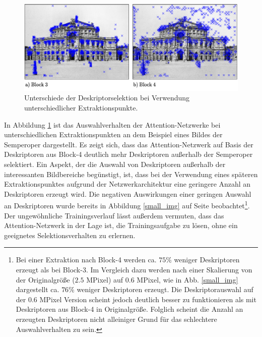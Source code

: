 \begin{figure}[h]
\centering
\includegraphics[scale=0.79]{attention_layer_diff}
\caption{Unterschiede der Deskriptorselektion bei Verwendung unterschiedlicher Extraktionspunkte.}
\label{attention_layer_diff}
\end{figure}
In Abbildung \ref{attention_layer_diff} ist das Auswahlverhalten der Attention-Netzwerke bei unterschiedlichen Extraktionspunkten an dem Beispiel eines Bildes der Semperoper dargestellt. Es zeigt sich, dass das Attention-Netzwerk auf Basis der Deskriptoren aus Block-4 deutlich mehr Deskriptoren außerhalb der Semperoper selektiert.
Ein Aspekt, der die Auswahl von Deskriptoren außerhalb der interessanten Bildbereiche begünstigt, ist, dass bei der Verwendung eines späteren Extraktionspunktes aufgrund der Netzwerkarchitektur eine geringere Anzahl an Deskriptoren erzeugt wird. Die negativen Auswirkungen einer geringen Auswahl an Deskriptoren wurde bereits in Abbildung \ref{small_img} auf Seite \pageref{small_img} beobachtet\footnote{Bei einer Extraktion nach Block-4 werden ca. $75 \%$ weniger Deskriptoren erzeugt als bei Block-3. Im Vergleich dazu werden nach einer Skalierung von der Originalgröße ($2.5$ MPixel) auf $0.6$ MPixel, wie in Abb. \ref{small_img} dargestellt ca. $76 \%$ weniger Deskriptoren erzeugt. Die Deskriptorauswahl auf der $0.6$ MPixel Version scheint jedoch deutlich besser zu funktionieren als mit Deskriptoren aus Block-4 in Originalgröße. Folglich scheint die Anzahl an erzeugten Deskriptoren nicht alleiniger Grund für das schlechtere Auswahlverhalten zu sein.}. Der ungewöhnliche Trainingsverlauf lässt außerdem vermuten, dass das Attention-Netzwerk in der Lage ist, die Trainingsaufgabe zu lösen, ohne ein geeignetes Selektionsverhalten zu erlernen.
\\
